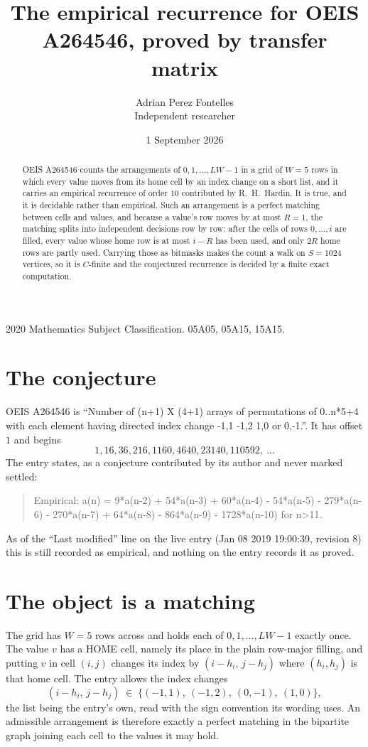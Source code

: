 \documentclass[11pt,a4paper]{article}
\title{The empirical recurrence for OEIS A264546, proved by transfer matrix}
\author{Adrian Perez Fontelles\\ \small Independent researcher}
\date{1 September 2026}
\theoremstyle{plain}
\theoremstyle{definition}
\begin{document}
\maketitle

\begin{abstract}
OEIS A264546 counts the arrangements of $0,1,\dots,LW-1$ in a grid of $W=5$ rows in which
every value moves from its home cell by an index change on a short list, and it carries an
empirical recurrence of order $10$ contributed by R.~H.~Hardin. It is true, and it is
decidable rather than empirical. Such an arrangement is a perfect matching between cells and
values, and because a value's row moves by at most $R=1$, the matching splits into
independent decisions row by row: after the cells of rows $0,\dots,i$ are filled,
every value whose home row is at most $i-R$ has been used, and only $2R$ home rows are
partly used. Carrying those as bitmasks makes the count a walk on $S=1024$ vertices, so it is
$C$-finite and the conjectured recurrence is decided by a finite exact computation.
\end{abstract}

\noindent\small 2020 Mathematics Subject Classification. 05A05, 05A15, 15A15.\normalsize

\section{The conjecture}

OEIS A264546 is ``Number of (n+1) X (4+1) arrays of permutations of 0..n*5+4 with each element having directed index change -1,1 -1,2 1,0 or 0,-1.''. It has offset $1$ and begins
\[
1, 16, 36, 216, 1160, 4640, 23140, 110592,\ \dots
\]
The entry states, as a conjecture contributed by its author and never marked settled:
\begin{quote}
Empirical: a(n) = 9*a(n-2) + 54*a(n-3) + 60*a(n-4) - 54*a(n-5) - 279*a(n-6) - 270*a(n-7) + 64*a(n-8) - 864*a(n-9) - 1728*a(n-10) for n>11.
\end{quote}
As of the ``Last modified'' line on the live entry (Jan 08 2019 19:00:39, revision 8) this is still
recorded as empirical, and nothing on the entry records it as proved.

\section{The object is a matching}

The grid has $W=5$ rows across and holds each of $0,1,\dots,LW-1$ exactly once. The value
$v$ has a HOME cell, namely its place in the plain row-major filling, and putting $v$ in cell
$(i,j)$ changes its index by $(i-h_i,\,j-h_j)$ where $(h_i,h_j)$ is that home cell. The entry
allows the index changes
\[
(i-h_i,\,j-h_j)\;\in\;\{(-1,1),\ (-1,2),\ (0,-1),\ (1,0)\},
\]
the list being the entry's own, read with the sign convention its wording uses. An admissible
arrangement is therefore exactly a perfect matching in the bipartite graph joining each cell to
the values it may hold.
\end{document}
